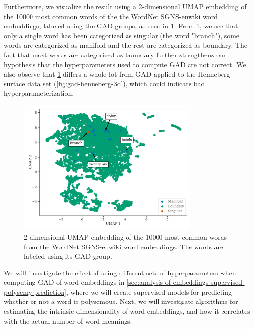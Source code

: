 Furthermore, we visualize the result using a 2-dimensional UMAP embedding of the 10000 most common words of the the WordNet SGNS-enwiki word embeddings, labeled using the GAD groups, as seen in \cref{fig:gad-umap-2d-10k-most-common-wordnet-enwiki-words}. From \cref{fig:gad-umap-2d-10k-most-common-wordnet-enwiki-words}, we see that only a single word has been categorized as singular (the word "branch"), some words are categorized as manifold and the rest are categorized as boundary. The fact that most words are categorized as boundary further strengthens our hypothesis that the hyperparameters used to compute GAD are not correct. We also observe that \cref{fig:gad-umap-2d-10k-most-common-wordnet-enwiki-words} differs a whole lot from GAD applied to the Henneberg surface data set (\cref{fig:gad-henneberg-3d}), which could indicate bad hyperparameterization.
\begin{figure}[H]
    \centering
    \includegraphics[width=0.8\textwidth]{thesis/figures/gad-umap-2d-10k-most-common-wordnet-enwiki-words.pdf}
    \caption{2-dimensional UMAP embedding of the 10000 most common words from the WordNet SGNS-enwiki word embeddings. The words are labeled using its GAD group.}
    \label{fig:gad-umap-2d-10k-most-common-wordnet-enwiki-words}
\end{figure}

We will investigate the effect of using different sets of hyperparameters when computing GAD of word embeddings in \cref{sec:analysis-of-embeddings-supervised-polysemy-prediction}, where we will create supervised models for predicting whether or not a word is polysemous. Next, we will investigate algorithms for estimating the intrinsic dimensionality of word embeddings, and how it correlates with the actual number of word meanings.

